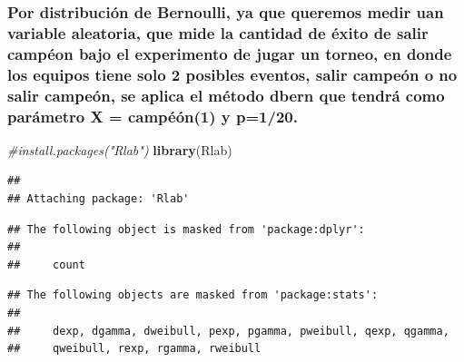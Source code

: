 \documentclass[]{article}
\newenvironment{Shaded}{\begin{snugshade}}{\end{snugshade}}
\newcommand{\CommentTok}[1]{\textcolor[rgb]{0.56,0.35,0.01}{\textit{#1}}}
\newcommand{\KeywordTok}[1]{\textcolor[rgb]{0.13,0.29,0.53}{\textbf{#1}}}
\newcommand{\NormalTok}[1]{#1}
\begin{document}
\hypertarget{por-distribucion-de-bernoulli-ya-que-queremos-medir-uan-variable-aleatoria-que-mide-la-cantidad-de-exito-de-salir-campeon-bajo-el-experimento-de-jugar-un-torneo-en-donde-los-equipos-tiene-solo-2-posibles-eventos-salir-campeon-o-no-salir-campeon-se-aplica-el-metodo-dbern-que-tendra-como-parametro-x-campeon1-y-p120.}{%
\subsubsection{\texorpdfstring{Por distribución de Bernoulli, ya que
queremos medir uan variable aleatoria, que mide la cantidad de éxito de
salir campéon bajo el experimento de jugar un torneo, en donde los
equipos tiene solo 2 posibles eventos, salir campeón o no salir campeón,
se aplica el método \textbf{dbern} que tendrá como parámetro X =
campéón(1) y
p=1/20.}{Por distribución de Bernoulli, ya que queremos medir uan variable aleatoria, que mide la cantidad de éxito de salir campéon bajo el experimento de jugar un torneo, en donde los equipos tiene solo 2 posibles eventos, salir campeón o no salir campeón, se aplica el método dbern que tendrá como parámetro X = campéón(1) y p=1/20.}}\label{por-distribucion-de-bernoulli-ya-que-queremos-medir-uan-variable-aleatoria-que-mide-la-cantidad-de-exito-de-salir-campeon-bajo-el-experimento-de-jugar-un-torneo-en-donde-los-equipos-tiene-solo-2-posibles-eventos-salir-campeon-o-no-salir-campeon-se-aplica-el-metodo-dbern-que-tendra-como-parametro-x-campeon1-y-p120.}}

\begin{Shaded}
\begin{Highlighting}[]
\CommentTok{#install.packages("Rlab")}
\KeywordTok{library}\NormalTok{(Rlab)}
\end{Highlighting}
\end{Shaded}

\begin{verbatim}
## 
## Attaching package: 'Rlab'
\end{verbatim}

\begin{verbatim}
## The following object is masked from 'package:dplyr':
## 
##     count
\end{verbatim}

\begin{verbatim}
## The following objects are masked from 'package:stats':
## 
##     dexp, dgamma, dweibull, pexp, pgamma, pweibull, qexp, qgamma,
##     qweibull, rexp, rgamma, rweibull
\end{verbatim}
\end{document}

